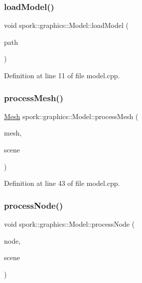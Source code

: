\subsubsection{\texorpdfstring{load\+Model()}{loadModel()}}
{\footnotesize\ttfamily void spork\+::graphics\+::\+Model\+::load\+Model (\begin{DoxyParamCaption}\item[{const \hyperlink{my_string_8h_afbeda3fd1bdc8c37d01bdf9f5c8274ff}{String} \&}]{path }\end{DoxyParamCaption})\hspace{0.3cm}{\ttfamily [private]}}



Definition at line 11 of file model.\+cpp.

\mbox{\label{classspork_1_1graphics_1_1_model_a6949747e22cc53f7e11a46d01a54c385}} 
\subsubsection{\texorpdfstring{process\+Mesh()}{processMesh()}}
{\footnotesize\ttfamily \hyperlink{classspork_1_1graphics_1_1_mesh}{Mesh} spork\+::graphics\+::\+Model\+::process\+Mesh (\begin{DoxyParamCaption}\item[{ai\+Mesh $\ast$}]{mesh,  }\item[{const ai\+Scene $\ast$}]{scene }\end{DoxyParamCaption})\hspace{0.3cm}{\ttfamily [private]}}



Definition at line 43 of file model.\+cpp.

\mbox{\label{classspork_1_1graphics_1_1_model_a3396b1f9e42c2c2adbe3265b489f7729}} 
\subsubsection{\texorpdfstring{process\+Node()}{processNode()}}
{\footnotesize\ttfamily void spork\+::graphics\+::\+Model\+::process\+Node (\begin{DoxyParamCaption}\item[{ai\+Node $\ast$}]{node,  }\item[{const ai\+Scene $\ast$}]{scene }\end{DoxyParamCaption})\hspace{0.3cm}{\ttfamily [private]}}



